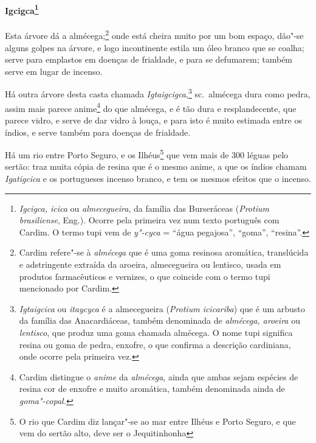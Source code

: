 \paragraph{Igcigca\footnote{ \textit{Igcigca, icica} ou
\textit{almecegueira}, da família das Burseráceas (\textit{Protium
brasiliense}, Eng.). Ocorre pela primeira vez num texto português com
Cardim. O termo tupi vem de \textit{y"-cyca} = ``água pegajosa'', ``goma'',
``resina''.}} Esta árvore dá a almécega;\footnote{ Cardim
refere"-se à \textit{almécega} que é uma goma resinosa aromática,
translúcida e adstringente extraída da aroeira, almecegueira ou
lentisco, usada em produtos farmacêuticos e vernizes, o que coincide
com o termo tupi mencionado por Cardim.} onde está cheira muito por um
bom espaço, dão"-se alguns golpes na árvore, e logo incontinente estila
um óleo branco que se coalha; serve para emplastos em doenças de
frialdade, e para se defumarem; também serve em lugar de incenso.

 Há outra árvore desta casta chamada \textit{Igtaigcigca},\footnote{ \textit{Igtaigcica} 
ou \textit{itaycyca} é a almecegueira
(\textit{Protium icicariba}) que é um arbusto da família das
Anacardiáceas, também denominada de \textit{almécega, aroeira} ou
\textit{lentisco}, que produz uma goma chamada almécega. O nome tupi
significa resina ou goma de pedra, enxofre, o que confirma a descrição
cardiniana, onde ocorre pela primeira vez.} sc.~almécega dura como
pedra, assim mais parece anime\footnote{ Cardim distingue o
\textit{anime} da \textit{almécega}, ainda que ambas sejam espécies de
resina cor de enxofre e muito aromática, também denominada ainda de
\textit{goma"-copal.}} do que almécega, e é tão dura e resplandecente,
que parece vidro, e serve de dar vidro à louça, e para isto é muito
estimada entre os índios, e serve também para doenças de frialdade.

 Há um rio entre Porto Seguro, e os Ilhéus\footnote{ O rio que Cardim
diz lançar"-se ao mar entre Ilhéus e Porto Seguro, e que vem do sertão
alto, deve ser o Jequitinhonha} que vem mais de 300 léguas
pelo sertão: traz muita cópia de resina que é o mesmo anime, a que os
índios chamam \textit{Igatigcica} e os portugueses incenso branco, e
tem os mesmos efeitos que o incenso.

